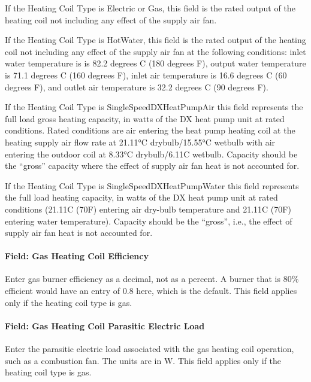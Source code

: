 If the Heating Coil Type is Electric or Gas, this field is the rated output of the heating coil not including any effect of the supply air fan.

If the Heating Coil Type is HotWater, this field is the rated output of the heating coil not including any effect of the supply air fan at the following conditions: inlet water temperature is is 82.2 degrees C (180 degrees F), output water temperature is 71.1 degrees C (160 degrees F), inlet air temperature is 16.6 degrees C (60 degrees F), and outlet air temperature is 32.2 degrees C (90 degrees F).

If the Heating Coil Type is SingleSpeedDXHeatPumpAir this field represents the full load gross heating capacity, in watts of the DX heat pump unit at rated conditions. Rated conditions are air entering the heat pump heating coil at the heating supply air flow rate at 21.11°C drybulb/15.55°C wetbulb with air entering the outdoor coil at 8.33°C drybulb/6.11C wetbulb. Capacity should be the ``gross'' capacity where the effect of supply air fan heat is not accounted for.

If the Heating Coil Type is SingleSpeedDXHeatPumpWater this field represents the full load heating capacity, in watts of the DX heat pump unit at rated conditions (21.11C (70F) entering air dry-bulb temperature and 21.11C (70F) entering water temperature). Capacity should be the ``gross'', i.e., the effect of supply air fan heat is not accounted for.

\paragraph{Field: Gas Heating Coil Efficiency}\label{field-gas-heating-coil-efficiency-2}

Enter gas burner efficiency as a decimal, not as a percent. A burner that is 80\% efficient would have an entry of 0.8 here, which is the default. This field applies only if the heating coil type is gas.

\paragraph{Field: Gas Heating Coil Parasitic Electric Load}\label{field-gas-heating-coil-parasitic-electric-load-2}

Enter the parasitic electric load associated with the gas heating coil operation, such as a combustion fan. The units are in W. This field applies only if the heating coil type is gas.


